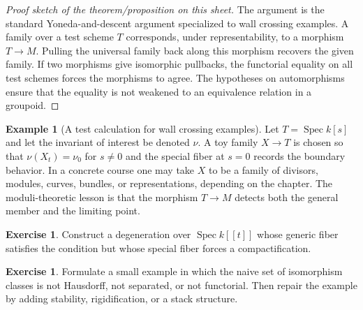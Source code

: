 \documentclass[11pt]{amsart}
\theoremstyle{definition}
\newtheorem{example}[theorem]{Example}
\newtheorem{exercise}[theorem]{Exercise}
\newcommand{\Spec}{\operatorname{Spec}}
\begin{document}
\begin{proof}[Proof sketch of the theorem/proposition on this sheet]
The argument is the standard Yoneda-and-descent argument specialized to wall crossing examples.  A family over a test scheme $T$ corresponds, under representability, to a morphism $T\to M$.  Pulling the universal family back along this morphism recovers the given family.  If two morphisms give isomorphic pullbacks, the functorial equality on all test schemes forces the morphisms to agree.  The hypotheses on automorphisms ensure that the equality is not weakened to an equivalence relation in a groupoid.
\end{proof}
\begin{example}[A test calculation for wall crossing examples]
Let $T=\Spec k[s]$ and let the invariant of interest be denoted $\nu$.  A toy family $X\to T$ is chosen so that $\nu(X_t)=\nu_0$ for $s\ne0$ and the special fiber at $s=0$ records the boundary behavior.  In a concrete course one may take $X$ to be a family of divisors, modules, curves, bundles, or representations, depending on the chapter.  The moduli-theoretic lesson is that the morphism $T\to M$ detects both the general member and the limiting point.
\end{example}
\begin{exercise}
Construct a degeneration over $\Spec k[[t]]$ whose generic fiber satisfies the condition but whose special fiber forces a compactification.
\end{exercise}
\begin{exercise}
Formulate a small example in which the naive set of isomorphism classes is not Hausdorff, not separated, or not functorial.  Then repair the example by adding stability, rigidification, or a stack structure.
\end{exercise}
\clearpage
\end{document}

